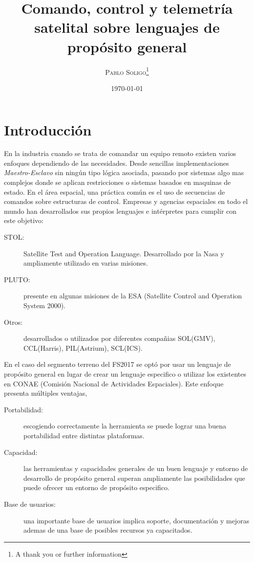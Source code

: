 \documentclass[twoside,twocolumn]{article}
\title{Comando, control y telemetría satelital sobre lenguajes de propósito general} %
\author{%
\textsc{Pablo Soligo}\thanks{A thank you or further information} \\[1ex] %
}
\date{\today} %
\begin{document}
\maketitle


\section{Introducción}

En la industria cuando se trata de comandar un equipo remoto existen varios enfoques dependiendo de las necesidades. Desde sencillas implementaciones \textit{Maestro-Esclavo} sin ningún tipo lógica asociada, pasando por sistemas algo mas complejos donde se aplican restricciones o sistemas basados en maquinas de estado. En el área espacial, una práctica común es el uso de secuencias de comandos sobre estructuras de control. Empresas y agencias espaciales en todo el mundo han desarrollados sus propios lenguajes e intérpretes para cumplir con este objetivo: 

\begin{description}
 \item [STOL:] Satellite Test and Operation Language. Desarrollado por la Nasa y ampliamente utilizado en varias misiones. 
 \item [PLUTO:] presente en algunas misiones de la ESA (Satellite Control and Operation System 2000).
 \item [Otros:] desarrollados o utilizados por diferentes compañias  SOL(GMV), CCL(Harris), PIL(Astrium), SCL(ICS). 
\end{description}

En el caso del segmento terreno del FS2017 se optó por usar un lenguaje de propósito general en lugar de crear un lenguaje especifico
o utilizar los existentes en CONAE (Comisión Nacional de Actividades Espaciales). Este enfoque presenta múltiples ventajas,

\begin{description}
 \item [Portabilidad: ] escogiendo correctamente la herramienta se puede lograr una buena portabilidad entre distintas plataformas.
 \item [Capacidad: ] las herramientas y capacidades generales de un buen lenguaje y entorno de desarrollo de propósito general superan ampliamente las posibilidades que puede ofrecer un entorno de propósito especifico.
 \item [Base de usuarios: ] una importante base de usuarios implica soporte, documentación y mejoras ademas de una base de posibles recursos ya capacitados. 
\end{description}
\end{document}
